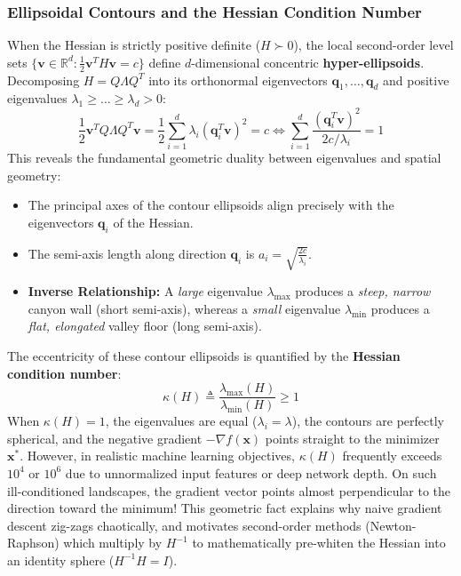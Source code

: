 \subsubsection{Ellipsoidal Contours and the Hessian Condition Number}
When the Hessian is strictly positive definite ($H \succ 0$), the local second-order level sets $\{\mathbf{v} \in \mathbb{R}^d : \frac{1}{2}\mathbf{v}^T H \mathbf{v} = c\}$ define $d$-dimensional concentric \textbf{hyper-ellipsoids}.
Decomposing $H = Q \Lambda Q^T$ into its orthonormal eigenvectors $\mathbf{q}_1, \dots, \mathbf{q}_d$ and positive eigenvalues $\lambda_1 \ge \dots \ge \lambda_d > 0$:
\begin{equation}
\frac{1}{2}\mathbf{v}^T Q \Lambda Q^T \mathbf{v} = \frac{1}{2} \sum_{i=1}^d \lambda_i (\mathbf{q}_i^T \mathbf{v})^2 = c \iff \sum_{i=1}^d \frac{(\mathbf{q}_i^T \mathbf{v})^2}{2c / \lambda_i} = 1
\end{equation}
This reveals the fundamental geometric duality between eigenvalues and spatial geometry:
\begin{itemize}
    \item The principal axes of the contour ellipsoids align precisely with the eigenvectors $\mathbf{q}_i$ of the Hessian.
    \item The semi-axis length along direction $\mathbf{q}_i$ is $a_i = \sqrt{\frac{2c}{\lambda_i}}$.
    \item \textbf{Inverse Relationship:} A \emph{large} eigenvalue $\lambda_{\max}$ produces a \emph{steep, narrow} canyon wall (short semi-axis), whereas a \emph{small} eigenvalue $\lambda_{\min}$ produces a \emph{flat, elongated} valley floor (long semi-axis).
\end{itemize}

The eccentricity of these contour ellipsoids is quantified by the \textbf{Hessian condition number}:
\begin{equation}
\kappa(H) \triangleq \frac{\lambda_{\max}(H)}{\lambda_{\min}(H)} \ge 1
\end{equation}
When $\kappa(H) = 1$, the eigenvalues are equal ($\lambda_i = \lambda$), the contours are perfectly spherical, and the negative gradient $-\nabla f(\mathbf{x})$ points straight to the minimizer $\mathbf{x}^*$.
However, in realistic machine learning objectives, $\kappa(H)$ frequently exceeds $10^4$ or $10^6$ due to unnormalized input features or deep network depth. On such ill-conditioned landscapes, the gradient vector points almost perpendicular to the direction toward the minimum! This geometric fact explains why naive gradient descent zig-zags chaotically, and motivates second-order methods (Newton-Raphson) which multiply by $H^{-1}$ to mathematically pre-whiten the Hessian into an identity sphere ($H^{-1}H = I$).

